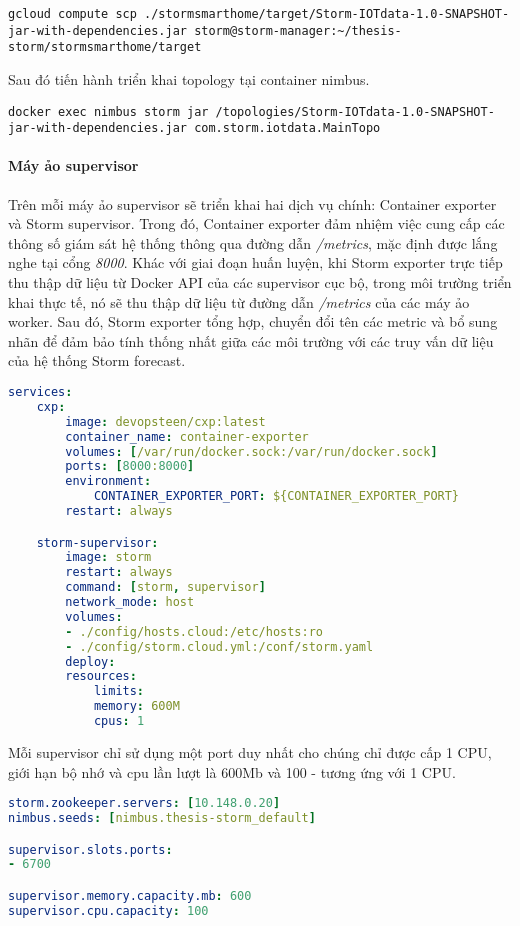 \begin{verbatim}
gcloud compute scp ./stormsmarthome/target/Storm-IOTdata-1.0-SNAPSHOT-jar-with-dependencies.jar storm@storm-manager:~/thesis-storm/stormsmarthome/target   
\end{verbatim}

Sau đó tiến hành triển khai topology tại container nimbus.

\begin{verbatim}
docker exec nimbus storm jar /topologies/Storm-IOTdata-1.0-SNAPSHOT-jar-with-dependencies.jar com.storm.iotdata.MainTopo
\end{verbatim}


\paragraph{Máy ảo supervisor}

Trên mỗi máy ảo supervisor sẽ triển khai hai dịch vụ chính: Container exporter \autocite{shayan_ghani_containerexporter} và Storm supervisor. Trong đó, Container exporter đảm nhiệm việc cung cấp các thông số giám sát hệ thống thông qua đường dẫn \textit{/metrics}, mặc định được lắng nghe tại cổng \textit{8000}. Khác với giai đoạn huấn luyện, khi Storm exporter trực tiếp thu thập dữ liệu từ Docker API của các supervisor cục bộ, trong môi trường triển khai thực tế, nó sẽ thu thập dữ liệu từ đường dẫn \textit{/metrics} của các máy ảo worker. Sau đó, Storm exporter tổng hợp, chuyển đổi tên các metric và bổ sung nhãn để đảm bảo tính thống nhất giữa các môi trường với các truy vấn dữ liệu của hệ thống Storm forecast.

\begin{lstlisting}[language=yaml, caption={Cấu hình các dịch vụ chạy trên máy ảo supervisor}]
services:
    cxp:
        image: devopsteen/cxp:latest
        container_name: container-exporter
        volumes: [/var/run/docker.sock:/var/run/docker.sock]
        ports: [8000:8000]
        environment:
            CONTAINER_EXPORTER_PORT: ${CONTAINER_EXPORTER_PORT}
        restart: always

    storm-supervisor:
        image: storm
        restart: always
        command: [storm, supervisor]
        network_mode: host
        volumes:
        - ./config/hosts.cloud:/etc/hosts:ro
        - ./config/storm.cloud.yml:/conf/storm.yaml
        deploy:
        resources:
            limits:
            memory: 600M
            cpus: 1
\end{lstlisting}

Mỗi supervisor chỉ sử dụng một port duy nhất cho chúng chỉ được cấp 1 CPU, giới hạn bộ nhớ và cpu lần lượt là 600Mb và 100 - tương ứng với 1 CPU.
\begin{lstlisting}[language=yaml, caption={Cấu hình của dịch vụ supervisor}]
storm.zookeeper.servers: [10.148.0.20]
nimbus.seeds: [nimbus.thesis-storm_default]

supervisor.slots.ports:
- 6700

supervisor.memory.capacity.mb: 600
supervisor.cpu.capacity: 100
\end{lstlisting}

